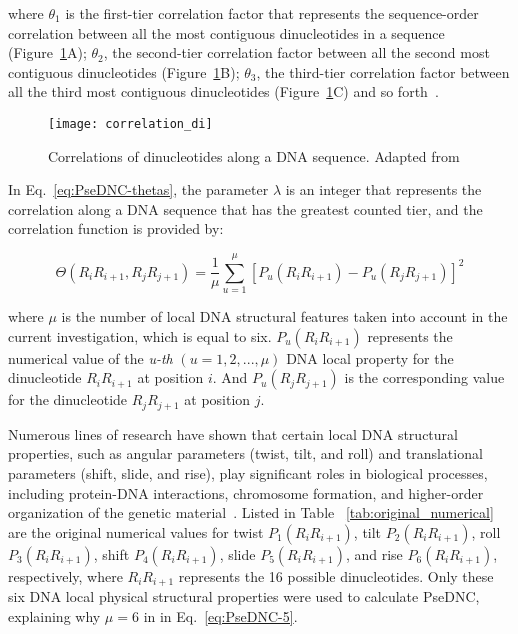 where $\theta_{1}$ is the first-tier correlation factor that represents the sequence-order correlation between all the most contiguous dinucleotides in a sequence (Figure~\ref{fig:psednc_correlation}A); $\theta_{2}$, the second-tier correlation factor between all the second most contiguous dinucleotides (Figure~\ref{fig:psednc_correlation}B); $\theta_{3}$, the third-tier correlation factor between all the third most contiguous dinucleotides (Figure~\ref{fig:psednc_correlation}C) and so forth~\cite{Chen2013IRSpot-PseDNC:Composition}.

\begin{figure}[htbp]
    \centering
    \texttt{[image: correlation\_di]}
    \caption{Correlations of dinucleotides along a DNA sequence. Adapted from~\cite{Chen2013IRSpot-PseDNC:Composition}}
    \label{fig:psednc_correlation}
\end{figure}


In Eq.~\ref{eq:PseDNC-thetas}, the parameter $\lambda$ is an integer that represents the correlation along a \gls{DNA} sequence that has the greatest counted tier, and the correlation function is provided by:

\begin{equation}\label{eq:PseDNC-5}
    \Theta(R_{i}R_{i+1}, R_{j}R_{j+1}) = \frac{1}{\mu}\sum_{u=1}^{\mu}[P_{u} (R_{i}R_{i+1}) - P_{u}(R_{j}R_{j+1})]^{2}
\end{equation}

where $\mu$ is the number of local \gls{DNA} structural features taken into account in the current investigation, which is equal to six. $P_{u} (R_{i}R_{i+1})$ represents the numerical value of the \textit{u-th} $(u = 1,2,...,\mu)$ \gls{DNA} local property for the dinucleotide $R_{i}R_{i+1}$ at position $i$. And $P_{u}(R_{j}R_{j+1})$ is the corresponding value for the dinucleotide $R_{j}R_{j+1}$ at position $j$.

Numerous lines of research have shown that certain local \gls{DNA} structural properties, such as angular parameters (twist, tilt, and roll) and translational parameters (shift, slide, and rise), play significant roles in biological processes, including protein-\gls{DNA} interactions, chromosome formation, and higher-order organization of the genetic material~\cite{Goni2008DNAlive:Scale,Goni2007DeterminingCalculations}. Listed in Table
~\ref{tab:original_numerical} are the original numerical values for twist $P_{1}(R_{i}R_{i+1})$⁠, tilt $P_{2}(R_{i}R_{i+1})$⁠, roll $P_{3}(R_{i}R_{i+1})$⁠, shift $P_{4}(R_{i}R_{i+1})$⁠, slide $P_{5}(R_{i}R_{i+1})$⁠, and rise $P_{6}(R_{i}R_{i+1})$⁠, respectively, where $R_{i}R_{i+1}$ represents the 16 possible dinucleotides. Only these six \gls{DNA} local physical structural properties were used to calculate \gls{PseDNC}, explaining why $\mu = 6$ in in Eq.~\ref{eq:PseDNC-5}.

